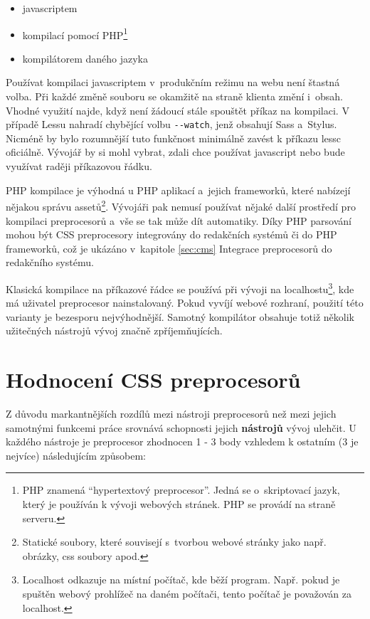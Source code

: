 \documentclass[thesis=B,czech]{FITthesis}[2012/06/26]
\begin{document}
\begin{itemize}
 \item javascriptem
 \item kompilací pomocí PHP\footnote{PHP znamená “hypertextový preprocesor”. Jedná se o~skriptovací jazyk, který je používán k vývoji webových stránek. PHP se provádí na straně serveru.}
 \item kompilátorem daného jazyka
\end{itemize}

Používat kompilaci javascriptem v~produkčním režimu na webu není štastná volba. Při každé změně souboru se okamžitě na straně klienta změní i~obsah. Vhodné využití najde, když není žádoucí stále spouštět příkaz na kompilaci. V případě Lessu nahradí chybějící volbu \verb#--watch#, jenž obsahují Sass a~Stylus. Nicméně by bylo rozumnější tuto funkčnost minimálně zavést k příkazu lessc oficiálně. Vývojář by si mohl vybrat, zdali chce používat javascript nebo bude využívat raději příkazovou řádku. 

PHP kompilace je výhodná u PHP aplikací a~jejich frameworků, které nabízejí nějakou správu assetů\footnote{Statické soubory, které souvisejí s~tvorbou webové stránky jako např. obrázky, css soubory apod.}. Vývojáři pak nemusí používat nějaké další prostředí pro kompilaci preprocesorů a~vše se tak může dít automatiky. Díky PHP parsování mohou být CSS preprocesory integrovány do redakčních systémů či do PHP frameworků, což je ukázáno v~kapitole \ref{sec:cms} Integrace preprocesorů do redakčního systému. 


Klasická kompilace na příkazové řádce se používá při vývoji na localhostu\footnote{Localhost odkazuje na místní počítač, kde běží program. Např. pokud je spuštěn webový prohlížeč na daném počítači, tento počítač je považován za localhost.}, kde má uživatel preprocesor nainstalovaný. Pokud vyvíjí webové rozhraní, použití této varianty je bezesporu nejvýhodnější. Samotný kompilátor obsahuje totiž několik užitečných nástrojů vývoj značně zpříjemňujících. 

\section{Hodnocení CSS preprocesorů}
Z důvodu markantnějších rozdílů mezi nástroji preprocesorů než mezi jejich samotnými funkcemi práce srovnává schopnosti jejich \textbf{nástrojů} vývoj ulehčit. U každého nástroje je preprocesor zhodnocen 1 - 3 body vzhledem k ostatním (3 je nejvíce) následujícím způsobem:
\end{document}
